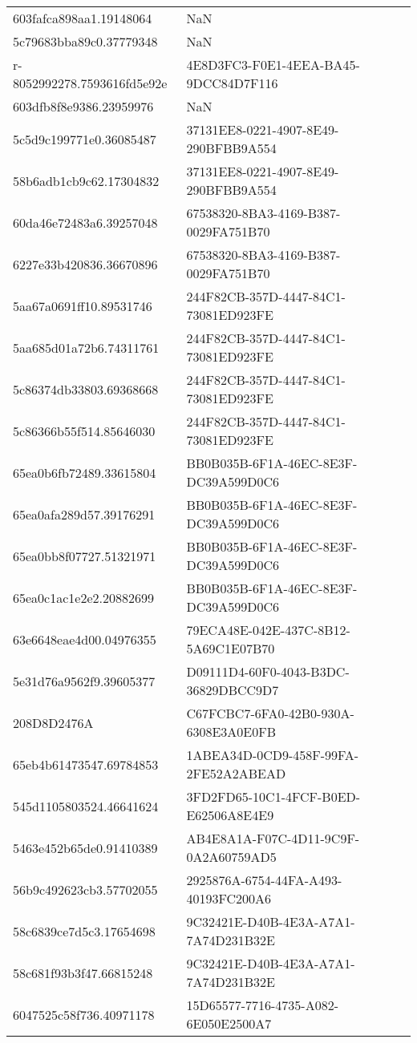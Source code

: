 \begin{tabular}{ll}
603fafca898aa1.19148064 & NaN \\
5c79683bba89c0.37779348 & NaN \\
r-8052992278.7593616fd5e92e & 4E8D3FC3-F0E1-4EEA-BA45-9DCC84D7F116 \\
603dfb8f8e9386.23959976 & NaN \\
5c5d9c199771e0.36085487 & 37131EE8-0221-4907-8E49-290BFBB9A554 \\
58b6adb1cb9c62.17304832 & 37131EE8-0221-4907-8E49-290BFBB9A554 \\
60da46e72483a6.39257048 & 67538320-8BA3-4169-B387-0029FA751B70 \\
6227e33b420836.36670896 & 67538320-8BA3-4169-B387-0029FA751B70 \\
5aa67a0691ff10.89531746 & 244F82CB-357D-4447-84C1-73081ED923FE \\
5aa685d01a72b6.74311761 & 244F82CB-357D-4447-84C1-73081ED923FE \\
5c86374db33803.69368668 & 244F82CB-357D-4447-84C1-73081ED923FE \\
5c86366b55f514.85646030 & 244F82CB-357D-4447-84C1-73081ED923FE \\
65ea0b6fb72489.33615804 & BB0B035B-6F1A-46EC-8E3F-DC39A599D0C6 \\
65ea0afa289d57.39176291 & BB0B035B-6F1A-46EC-8E3F-DC39A599D0C6 \\
65ea0bb8f07727.51321971 & BB0B035B-6F1A-46EC-8E3F-DC39A599D0C6 \\
65ea0c1ac1e2e2.20882699 & BB0B035B-6F1A-46EC-8E3F-DC39A599D0C6 \\
63e6648eae4d00.04976355 & 79ECA48E-042E-437C-8B12-5A69C1E07B70 \\
5e31d76a9562f9.39605377 & D09111D4-60F0-4043-B3DC-36829DBCC9D7 \\
208D8D2476A & C67FCBC7-6FA0-42B0-930A-6308E3A0E0FB \\
65eb4b61473547.69784853 & 1ABEA34D-0CD9-458F-99FA-2FE52A2ABEAD \\
545d1105803524.46641624 & 3FD2FD65-10C1-4FCF-B0ED-E62506A8E4E9 \\
5463e452b65de0.91410389 & AB4E8A1A-F07C-4D11-9C9F-0A2A60759AD5 \\
56b9c492623cb3.57702055 & 2925876A-6754-44FA-A493-40193FC200A6 \\
58c6839ce7d5c3.17654698 & 9C32421E-D40B-4E3A-A7A1-7A74D231B32E \\
58c681f93b3f47.66815248 & 9C32421E-D40B-4E3A-A7A1-7A74D231B32E \\
6047525c58f736.40971178 & 15D65577-7716-4735-A082-6E050E2500A7 \\

\end{tabular}
